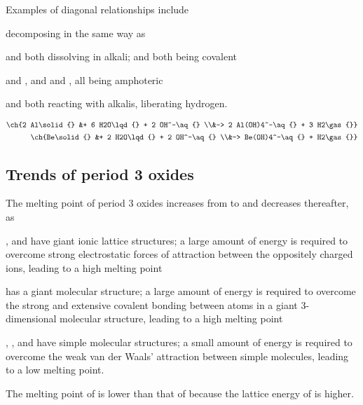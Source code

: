 \documentclass[Chemistry.tex]{subfiles}
\begin{document}
Examples of diagonal relationships include \begin{slinenum}
\item {} decomposing in the same way as 
\item {} and  both dissolving in alkali;  and  both being covalent
\item {} and , and  and , all being amphoteric
\item {} and  both reacting with alkalis, liberating hydrogen.
\end{slinenum} \begin{align}\begin{split}\ch{2 Al\solid{} &+ 6 H2O\lqd{} + 2 OH^-\aq{} \\&-> 2 Al(OH)4^-\aq{} + 3 H2\gas{}}\end{split}\\\begin{split}\ch{Be\solid{} &+ 2 H2O\lqd{} + 2 OH^-\aq{} \\&-> Be(OH)4^-\aq{} + H2\gas{}}\end{split}\end{align}
\subsection{Trends of period 3 oxides}
The melting point of period 3 oxides increases from  to  and decreases thereafter, as \begin{slinenum}
\item {},  and  have giant ionic lattice structures; a large amount of energy is required to overcome strong electrostatic forces of attraction between the oppositely charged ions, leading to a high melting point
\item {} has a giant molecular structure; a large amount of energy is required to overcome the strong and extensive covalent bonding between atoms in a giant 3-dimensional molecular structure, leading to a high melting point
\item {}, ,  and  have simple molecular structures; a small amount of energy is required to overcome the weak van der Waals' attraction between simple molecules, leading to a low melting point.
\end{slinenum}

The melting point of  is lower than that of  because the lattice energy of  is higher.
\end{document}
